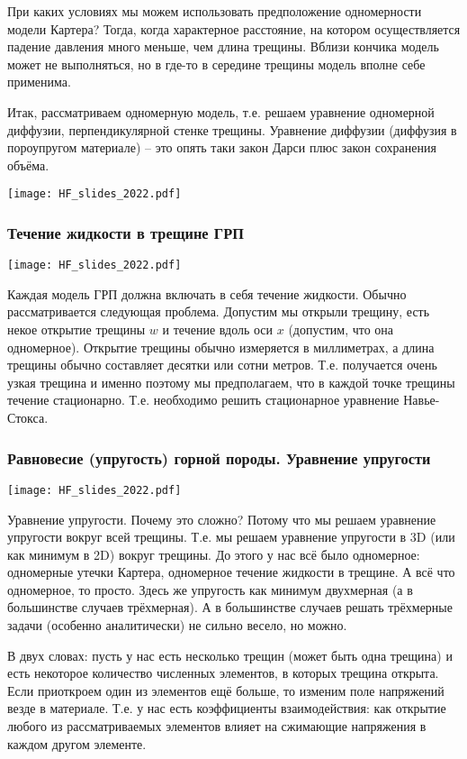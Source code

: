 \documentclass[main.tex]{subfiles}
\begin{document}
При каких условиях мы можем использовать предположение одномерности модели Картера?
Тогда, когда характерное расстояние, на котором осуществляется падение давления много меньше, чем длина трещины.
Вблизи кончика модель может не выполняться, но в где-то в середине трещины модель вполне себе применима.

Итак, рассматриваем одномерную модель, т.е. решаем уравнение одномерной диффузии, перпендикулярной стенке трещины.
Уравнение диффузии (диффузия в пороупругом материале) -- это опять таки закон Дарси плюс закон сохранения объёма.


\texttt{[image: HF\_slides\_2022.pdf]}

\subsubsection{Течение жидкости в трещине ГРП}

\texttt{[image: HF\_slides\_2022.pdf]}

Каждая модель ГРП должна включать в себя течение жидкости.
Обычно рассматривается следующая проблема.
Допустим мы открыли трещину, есть некое открытие трещины $w$ и течение вдоль оси $x$ (допустим, что она одномерное).
Открытие трещины обычно измеряется в миллиметрах, а длина трещины обычно составляет десятки или сотни метров. Т.е. получается очень узкая трещина и именно поэтому мы предполагаем, что в каждой точке трещины течение стационарно.
Т.е. необходимо решить стационарное уравнение Навье-Стокса.

\subsubsection{Равновесие (упругость) горной породы. Уравнение упругости}

\texttt{[image: HF\_slides\_2022.pdf]}

Уравнение упругости.
Почему это сложно?
Потому что мы решаем уравнение упругости вокруг всей трещины.
Т.е. мы решаем уравнение упругости в 3D (или как минимум в 2D) вокруг трещины.
До этого у нас всё было одномерное: одномерные утечки Картера, одномерное течение жидкости в трещине.
А всё что одномерное, то просто.
Здесь же упругость как минимум двухмерная (а в большинстве случаев трёхмерная).
А в большинстве случаев решать трёхмерные задачи (особенно аналитически) не сильно весело, но можно.

В двух словах: пусть у нас есть несколько трещин (может быть одна трещина) и есть некоторое количество численных элементов, в которых трещина открыта.
Если приоткроем один из элементов ещё больше, то изменим поле напряжений везде в материале.
Т.е. у нас есть коэффициенты взаимодействия: как открытие любого из рассматриваемых элементов влияет на сжимающие напряжения в каждом другом элементе.
\end{document}
